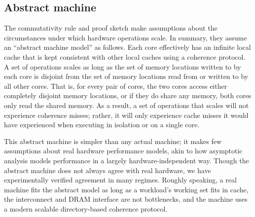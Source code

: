 \subsection{Abstract machine}
\label{sec:abscal}

The commutativity rule and proof sketch make assumptions about the
circumstances under which hardware operations scale. In summary, they
assume an ``abstract machine model'' as follows. Each core effectively
has an infinite local cache that is kept consistent with other local
caches using a coherence protocol. A set of operations scales as long
as the set of memory locations written to by each core is disjoint
from the set of memory locations read from or written to by all other
cores. That is, for every pair of cores, the two cores access either
completely disjoint memory locations, or if they do share any memory,
both cores only read the shared memory. As a result, a set of
operations that scales will not experience coherence misses; rather,
it will only experience cache misses it would have experienced when
executing in isolation or on a single core.

This abstract machine is simpler than any actual machine; it makes few
assumptions about real hardware performance models, akin to how
asymptotic analysis models performance in a largely
hardware-independent way. Though the abstract machine does not always
agree with real hardware, we have experimentally verified agreement in many
regimes. 
Roughly speaking, a real machine fits the abstract model as long as a
workload's working set fits in cache, the interconnect and DRAM
interface are not bottlenecks, and the machine uses a modern
scalable directory-based coherence protocol.

